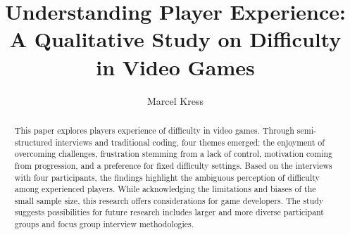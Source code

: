 \documentclass[acmlarge]{acmart}
\begin{document}
\title{Understanding Player Experience: A Qualitative Study on Difficulty in Video Games}
\author{Marcel Kress}
\begin{abstract}
This paper explores players experience of difficulty in video games. Through semi-structured interviews and traditional coding, four themes emerged: the enjoyment of overcoming challenges, frustration stemming from a lack of control, motivation coming from progression, and a preference for fixed difficulty settings. Based on the interviews with four participants, the findings highlight the ambiguous perception of difficulty among experienced players. While acknowledging the limitations and biases of the small sample size, this research offers considerations for game developers. The study suggests possibilities for future research includes larger and more diverse participant groups and focus group interview methodologies.
\end{abstract}

\maketitle






\end{document}
